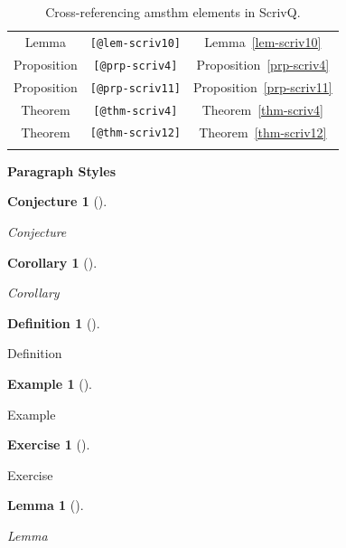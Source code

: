 \documentclass[
  12pt,
  a4paper,
  oneside,
  numbers=noenddot,
  titlepage,
  toclink=all,
  toc=bibliography]{scrbook}
\theoremstyle{definition}
\newtheorem{definition}{Definition}[section]
\theoremstyle{definition}
\newtheorem{example}{Example}[section]
\theoremstyle{definition}
\newtheorem{exercise}{Exercise}[section]
\theoremstyle{plain}
\theoremstyle{plain}
\newtheorem{lemma}{Lemma}[section]
\theoremstyle{plain}
\newtheorem{conjecture}{Conjecture}[section]
\theoremstyle{plain}
\newtheorem{corollary}{Corollary}[section]
\theoremstyle{plain}
\theoremstyle{remark}
\begin{document}
\begin{longtable}[]{@{}ccc@{}}
Lemma & \texttt{{[}@lem-scriv10{]}} &
\protect\hypertarget{cite_60}{}{\label{cite_60}Lemma~\ref{lem-scriv10}} \\
Proposition & \texttt{{[}@prp-scriv4{]}} &
\protect\hypertarget{cite_61}{}{\label{cite_61}Proposition~\ref{prp-scriv4}} \\
Proposition & \texttt{{[}@prp-scriv11{]}} &
\protect\hypertarget{cite_62}{}{\label{cite_62}Proposition~\ref{prp-scriv11}} \\
Theorem & \texttt{{[}@thm-scriv4{]}} &
\protect\hypertarget{cite_63}{}{\label{cite_63}Theorem~\ref{thm-scriv4}} \\
Theorem & \texttt{{[}@thm-scriv12{]}} &
\protect\hypertarget{cite_64}{}{\label{cite_64}Theorem~\ref{thm-scriv12}} \\
\caption{\label{tbl-scriv4}Cross-referencing amsthm elements in
ScrivQ.}\tabularnewline
\end{longtable}

\textbf{Paragraph Styles}

\begin{conjecture}[]\protect\hypertarget{cnj-scriv4}{}\label{cnj-scriv4}

Conjecture

\end{conjecture}

\begin{corollary}[]\protect\hypertarget{cor-scriv4}{}\label{cor-scriv4}

Corollary

\end{corollary}

\begin{definition}[]\protect\hypertarget{def-scriv4}{}\label{def-scriv4}

Definition

\end{definition}

\begin{example}[]\protect\hypertarget{exm-scriv4}{}\label{exm-scriv4}

Example

\end{example}

\begin{exercise}[]\protect\hypertarget{exr-scriv4}{}\label{exr-scriv4}

Exercise

\end{exercise}

\begin{lemma}[]\protect\hypertarget{lem-scriv4}{}\label{lem-scriv4}

Lemma

\end{lemma}
\end{document}
